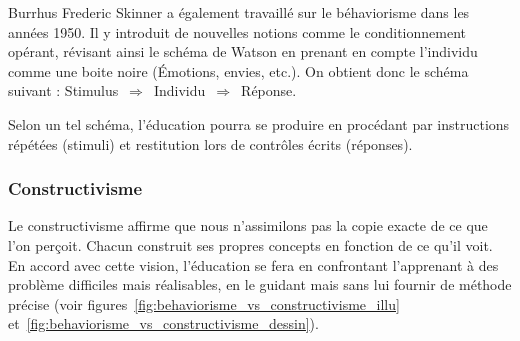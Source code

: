 Burrhus Frederic Skinner a également travaillé sur le béhaviorisme dans les années 1950. Il y introduit de nouvelles notions comme le conditionnement opérant, révisant ainsi le schéma de Watson en prenant en compte l'individu comme une \og boite noire \fg{} (Émotions, envies, etc.). On obtient donc le schéma suivant : Stimulus~$\Rightarrow$~Individu~$\Rightarrow$~Réponse.

Selon un tel schéma, l'éducation pourra se produire en procédant par instructions répétées (stimuli) et restitution lors de contrôles écrits (réponses).

\subsubsection{Constructivisme}
Le constructivisme affirme que nous n'assimilons pas la copie exacte
de ce que l'on perçoit\cite{wikipedia_constructivisme}. Chacun construit ses propres concepts en
fonction de ce qu'il voit. En accord avec cette vision, l'éducation
se fera en confrontant l'apprenant à des problème difficiles mais
réalisables, en le guidant mais sans lui fournir de méthode précise
(voir figures~\ref{fig:behaviorisme_vs_constructivisme_illu} et~\ref{fig:behaviorisme_vs_constructivisme_dessin}).


